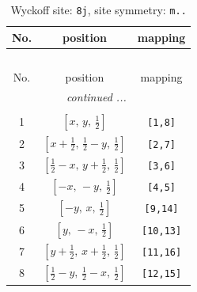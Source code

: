 \documentclass[fleqn,8pt]{jsarticle}
\begin{document}
\begin{longtable}{ccc}
\caption{Wyckoff site: {\tt 8j}, site symmetry: {\tt m..}}
 \\
 \hline \hline
No. & position & mapping \\ \hline \endfirsthead

\multicolumn{2}{l}{\tablename\ \thetable{}} \\
 \hline \hline
No. & position & mapping \\ \hline \endhead

 \hline \hline
\multicolumn{2}{r}{\footnotesize\it continued ...} \\ \endfoot

 \hline \hline
\multicolumn{2}{r}{} \\ \endlastfoot

1 & $\left[ x,\, y,\, \frac{1}{2} \right]$ & {\tt [1,8]} \\ \hline
2 & $\left[ x + \frac{1}{2},\, \frac{1}{2} - y,\, \frac{1}{2} \right]$ & {\tt [2,7]} \\ \hline
3 & $\left[ \frac{1}{2} - x,\, y + \frac{1}{2},\, \frac{1}{2} \right]$ & {\tt [3,6]} \\ \hline
4 & $\left[ - x,\, - y,\, \frac{1}{2} \right]$ & {\tt [4,5]} \\ \hline
5 & $\left[ - y,\, x,\, \frac{1}{2} \right]$ & {\tt [9,14]} \\ \hline
6 & $\left[ y,\, - x,\, \frac{1}{2} \right]$ & {\tt [10,13]} \\ \hline
7 & $\left[ y + \frac{1}{2},\, x + \frac{1}{2},\, \frac{1}{2} \right]$ & {\tt [11,16]} \\ \hline
8 & $\left[ \frac{1}{2} - y,\, \frac{1}{2} - x,\, \frac{1}{2} \right]$ & {\tt [12,15]} \\
\end{longtable}
\renewcommand{\arraystretch}{1.2}
\end{document}
